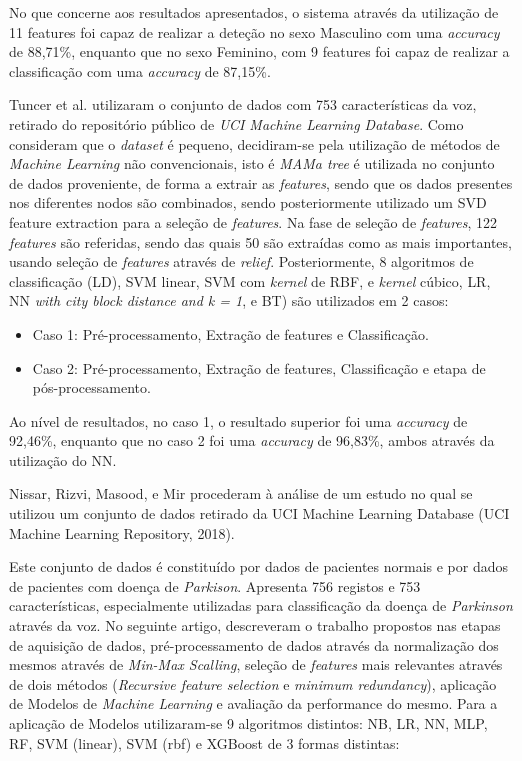 \documentclass[12pt,a4paper,twoside]{report}
\begin{document}
{No que concerne aos resultados apresentados, o sistema através da utilização de 11 features foi capaz de realizar a deteção no sexo Masculino com uma \textit{accuracy} de 88,71\%, enquanto que no sexo Feminino, com 9 features foi capaz de realizar a classificação com uma \textit{accuracy} de 87,15\%.

Tuncer et al. \cite{Tuncer2020} utilizaram o conjunto de dados com 753 características da voz, retirado do repositório público de \textit{UCI Machine Learning Database}. Como consideram que o \textit{dataset} é pequeno, decidiram-se pela utilização de métodos de \textit{Machine Learning} não convencionais, isto é \textit{MAMa tree} é utilizada no conjunto de dados proveniente, de forma a extrair as \textit{features}, sendo que os dados presentes nos diferentes nodos são combinados, sendo posteriormente utilizado um \gls{SVD} feature extraction para a seleção de \textit{features}. Na fase de seleção de \textit{features}, 122 \textit{features} são referidas, sendo das quais 50 são extraídas como as mais importantes, usando seleção de \textit{features} através de \textit{relief}. Posteriormente, 8 algoritmos de classificação (\gls{LD}), \gls{SVM} linear, \Gls{SVM} com \textit{kernel} de \gls{RBF}, e \textit{kernel} cúbico, \gls{LR}, \gls{NN} \textit{with city block distance and k = 1}, e \gls{BT}) são utilizados em 2 casos:
\begin{itemize}
    \item Caso 1: Pré-processamento, Extração de features e Classificação.
    \item Caso 2: Pré-processamento, Extração de features, Classificação e etapa de pós-processamento.
\end{itemize}

Ao nível de resultados, no caso 1, o resultado superior foi uma \textit{accuracy} de 92,46\%, enquanto que no caso 2 foi uma \textit{accuracy} de 96,83\%, ambos através da utilização do \gls{NN}.

Nissar, Rizvi, Masood, e Mir \cite{nissaretall} procederam à análise de um estudo no qual se utilizou um conjunto de dados retirado da UCI Machine Learning Database (UCI Machine Learning Repository, 2018). 

Este conjunto de dados é constituído por dados de pacientes normais e por dados de pacientes com doença de \textit{Parkison}. Apresenta 756 registos e 753 características, especialmente utilizadas para classificação
da doença de \textit{Parkinson} através da voz. No seguinte artigo, descreveram o trabalho propostos nas etapas de aquisição de dados, pré-processamento de dados através da normalização dos mesmos através de \textit{Min-Max Scalling},  seleção de \textit{features} mais relevantes através de dois métodos (\textit{Recursive feature selection} e \textit{minimum redundancy}), aplicação de Modelos de \textit{Machine Learning} e avaliação da performance do mesmo. Para a aplicação de Modelos utilizaram-se 9 algoritmos distintos: \gls{NB}, \gls{LR}, \gls{NN}, \Gls{MLP}, \gls{RF}, \Gls{SVM} (linear), \Gls{SVM} (rbf) e \gls{XGBoost} de 3 formas distintas:

}
\end{document}
